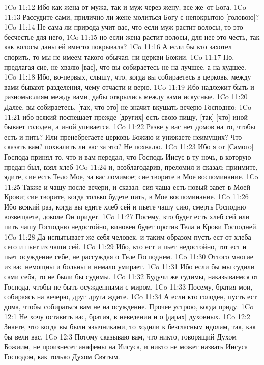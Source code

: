 1Co 11:12  Ибо как жена от мужа, так и муж через жену; все же--от Бога.
1Co 11:13  Рассудите сами, прилично ли жене молиться Богу с непокрытою [головою]?
1Co 11:14  Не сама ли природа учит вас, что если муж растит волосы, то это бесчестье для него,
1Co 11:15  но если жена растит волосы, для нее это честь, так как волосы даны ей вместо покрывала?
1Co 11:16  А если бы кто захотел спорить, то мы не имеем такого обычая, ни церкви Божии.
1Co 11:17  Но, предлагая сие, не хвалю [вас], что вы собираетесь не на лучшее, а на худшее.
1Co 11:18  Ибо, во-первых, слышу, что, когда вы собираетесь в церковь, между вами бывают разделения, чему отчасти и верю.
1Co 11:19  Ибо надлежит быть и разномыслиям между вами, дабы открылись между вами искусные.
1Co 11:20  Далее, вы собираетесь, [так, что это] не значит вкушать вечерю Господню;
1Co 11:21  ибо всякий поспешает прежде [других] есть свою пищу, [так] [что] иной бывает голоден, а иной упивается.
1Co 11:22  Разве у вас нет домов на то, чтобы есть и пить? Или пренебрегаете церковь Божию и унижаете неимущих? Что сказать вам? похвалить ли вас за это? Не похвалю.
1Co 11:23  Ибо я от [Самого] Господа принял то, что и вам передал, что Господь Иисус в ту ночь, в которую предан был, взял хлеб
1Co 11:24  и, возблагодарив, преломил и сказал: приимите, ядите, сие есть Тело Мое, за вас ломимое; сие творите в Мое воспоминание.
1Co 11:25  Также и чашу после вечери, и сказал: сия чаша есть новый завет в Моей Крови; сие творите, когда только будете пить, в Мое воспоминание.
1Co 11:26  Ибо всякий раз, когда вы едите хлеб сей и пьете чашу сию, смерть Господню возвещаете, доколе Он придет.
1Co 11:27  Посему, кто будет есть хлеб сей или пить чашу Господню недостойно, виновен будет против Тела и Крови Господней.
1Co 11:28  Да испытывает же себя человек, и таким образом пусть ест от хлеба сего и пьет из чаши сей.
1Co 11:29  Ибо, кто ест и пьет недостойно, тот ест и пьет осуждение себе, не рассуждая о Теле Господнем.
1Co 11:30  Оттого многие из вас немощны и больны и немало умирает.
1Co 11:31  Ибо если бы мы судили сами себя, то не были бы судимы.
1Co 11:32  Будучи же судимы, наказываемся от Господа, чтобы не быть осужденными с миром.
1Co 11:33  Посему, братия мои, собираясь на вечерю, друг друга ждите.
1Co 11:34  А если кто голоден, пусть ест дома, чтобы собираться вам не на осуждение. Прочее устрою, когда приду.
1Co 12:1  Не хочу оставить вас, братия, в неведении и о [дарах] духовных.
1Co 12:2  Знаете, что когда вы были язычниками, то ходили к безгласным идолам, так, как бы вели вас.
1Co 12:3  Потому сказываю вам, что никто, говорящий Духом Божиим, не произнесет анафемы на Иисуса, и никто не может назвать Иисуса Господом, как только Духом Святым.
